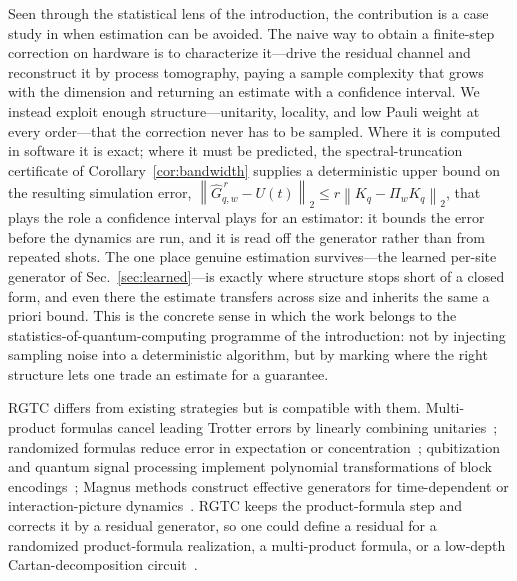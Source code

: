 \documentclass[aps,prresearch,reprint,superscriptaddress,nofootinbib,amsmath,amssymb]{revtex4-2}
\newcommand{\rgtc}{RGTC}
\newcommand{\norm}[1]{\left\lVert #1 \right\rVert}
\begin{document}
Seen through the statistical lens of the introduction, the contribution is a case study in when estimation can be avoided. The naive way to obtain a finite-step correction on hardware is to characterize it---drive the residual channel and reconstruct it by process tomography, paying a sample complexity that grows with the dimension and returning an estimate with a confidence interval. We instead exploit enough structure---unitarity, locality, and low Pauli weight at every order---that the correction never has to be sampled. Where it is computed in software it is exact; where it must be predicted, the spectral-truncation certificate of Corollary~\ref{cor:bandwidth} supplies a deterministic upper bound on the resulting simulation error, $\norm{\widehat G_{q,w}^{\,r}-U(t)}_2\leq r\norm{K_q-\Pi_wK_q}_2$, that plays the role a confidence interval plays for an estimator: it bounds the error before the dynamics are run, and it is read off the generator rather than from repeated shots. The one place genuine estimation survives---the learned per-site generator of Sec.~\ref{sec:learned}---is exactly where structure stops short of a closed form, and even there the estimate transfers across size and inherits the same a priori bound. This is the concrete sense in which the work belongs to the statistics-of-quantum-computing programme of the introduction: not by injecting sampling noise into a deterministic algorithm, but by marking where the right structure lets one trade an estimate for a guarantee.

\rgtc{} differs from existing strategies but is compatible with them. Multi-product formulas cancel leading Trotter errors by linearly combining unitaries~\cite{childs2012mpf}; randomized formulas reduce error in expectation or concentration~\cite{campbell2019,ouyang2020,childs2022,chen2022a}; qubitization and quantum signal processing implement polynomial transformations of block encodings~\cite{berry2007,berry2014,low2017qsp,low2019qubitization}; Magnus methods construct effective generators for time-dependent or interaction-picture dynamics~\cite{magnus1954,blanes2009,sharma2024,fang2025}. \rgtc{} keeps the product-formula step and corrects it by a residual generator, so one could define a residual for a randomized product-formula realization, a multi-product formula, or a low-depth Cartan-decomposition circuit~\cite{kokcu2022,steckmann2023}.
\end{document}
